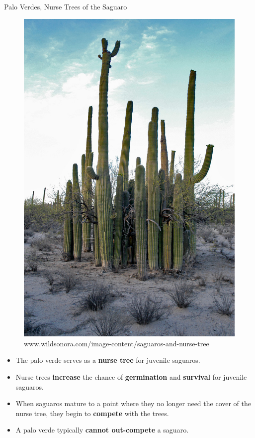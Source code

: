 \documentclass{beamer}
\begin{document}
\begin{frame}{Palo Verdes, Nurse Trees of the Saguaro}

\begin{minipage}{0.49\textwidth}
\begin{figure}[center]
\includegraphics[scale=0.2]{saguaro-nurse-tree.jpg}\\
\tiny{www.wildsonora.com/image-content/saguaros-and-nurse-tree}
\end{figure}
\end{minipage}
\hfill
\begin{minipage}{0.49\textwidth}
\small{\begin{itemize}
\item The palo verde serves as a \textbf{nurse tree} for juvenile saguaros.
\item<2-> Nurse trees \textbf{increase} the chance of \textbf{germination} and \textbf{survival} for juvenile saguaros.
\item<3-> When saguaros mature to a point where they no longer need the cover of the nurse tree, they begin to \textbf{compete} with the trees.
\item<4-> A palo verde typically \textbf{cannot out-compete} a saguaro.
\end{itemize}}
\end{minipage}
\end{frame}
\end{document}
